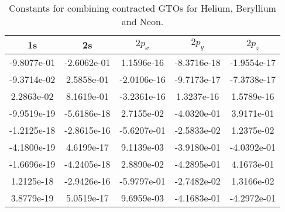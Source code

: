 \begin{table}
\begin{centering}
	\par
	\begin{subtable}{1.0\linewidth}
		\begin{centering}
		\begin{tabular}{|c|c|c|c|c|}
			\hline 
			1s & 2s & $2p_{x}$  & $2p_{y}$ & $2p_{z}$\tabularnewline
			\hline 
			-9.8077e-01 & -2.6062e-01 & 1.1596e-16 & -8.3716e-18 & -1.9554e-17\tabularnewline
			\hline 
			-9.3714e-02 & 2.5858e-01 & -2.0106e-16 & -9.7173e-17 & -7.3738e-17\tabularnewline
			\hline 
			2.2863e-02 & 8.1619e-01 & -3.2361e-16 & 1.3237e-16 & 1.5789e-16\tabularnewline
			\hline 
			-9.9519e-19  & -5.6186e-18 & 2.7155e-02 & -4.0320e-01 & 3.9171e-01\tabularnewline
			\hline 
			-1.2125e-18 & -2.8615e-16 & -5.6207e-01 & -2.5833e-02 & 1.2375e-02\tabularnewline
			\hline 
			-4.1800e-19 & 4.6199e-17 & 9.1139e-03 & -3.9180e-01 & -4.0392e-01\tabularnewline
			\hline 
			-1.6696e-19 & -4.2405e-18 & 2.8890e-02 & -4.2895e-01 & 4.1673e-01\tabularnewline
			\hline 
			1.2125e-18 & -2.9426e-16 & -5.9797e-01 & -2.7482e-02 & 1.3166e-02\tabularnewline
			\hline 
			3.8779e-19 & 5.0519e-17 & 9.6959e-03 & -4.1683e-01 & -4.2972e-01\tabularnewline
			\hline 
		\end{tabular}
		\par\end{centering}
	\end{subtable}

	
	\par

	\end{centering}
	\protect
	\caption{Constants for combining contracted GTOs for Helium, Beryllium and
	Neon.}
	\label{tab:He_Be_Ne_K}

\end{table}

